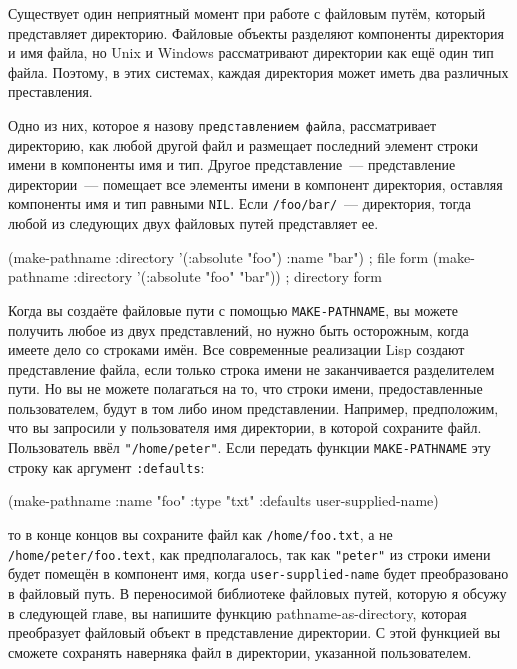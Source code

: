 Существует один неприятный момент при работе с файловым путём, который представляет
директорию. Файловые объекты разделяют компоненты директория и имя файла, но Unix и
Windows рассматривают директории как ещё один тип файла. Поэтому, в этих системах, каждая
директория может иметь два различных преставления.

Одно из них, которое я назову \lstinline{представлением файла}, рассматривает директорию, как
любой другой файл и размещает последний элемент строки имени в компоненты имя и
тип. Другое представление~--- представление директории~--- помещает все элементы имени в
компонент директория, оставляя компоненты имя и тип равными \lstinline{NIL}. Если
\lstinline{/foo/bar/}~--- директория, тогда любой из следующих двух файловых путей представляет
ее.

\begin{myverb}
(make-pathname :directory '(:absolute "foo") :name "bar") ; file form 
(make-pathname :directory '(:absolute "foo" "bar"))       ; directory form 
\end{myverb}

Когда вы создаёте файловые пути с помощью \lstinline{MAKE-PATHNAME}, вы можете получить любое
из двух представлений, но нужно быть осторожным, когда имеете дело со строками имён. Все
современные реализации Lisp создают представление файла, если только строка имени не
заканчивается разделителем пути. Но вы не можете полагаться на то, что строки имени,
предоставленные пользователем, будут в том либо ином представлении. Например, предположим,
что вы запросили у пользователя имя директории, в которой сохраните файл. Пользователь
ввёл \lstinline!"/home/peter"!. Если передать функции \lstinline{MAKE-PATHNAME} эту строку как
аргумент \lstinline{:defaults}:

\begin{myverb}
(make-pathname :name "foo" :type "txt" :defaults user-supplied-name) 
\end{myverb}

то в конце концов вы сохраните файл как \lstinline{/home/foo.txt}, а не
\lstinline{/home/peter/foo.text}, как предполагалось, так как \lstinline{"peter"} из строки имени
будет помещён в компонент имя, когда \lstinline{user-supplied-name} будет преобразовано в
файловый путь. В переносимой библиотеке файловых путей, которую я обсужу в следующей
главе, вы напишите функцию pathname-as-directory, которая преобразует файловый объект в
представление директории. С этой функцией вы сможете сохранять наверняка файл в
директории, указанной пользователем.

